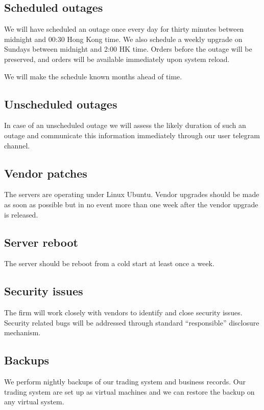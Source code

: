 \subsection{Scheduled outages}
We will have scheduled an outage once every day for thirty minutes
between midnight and 00:30 Hong Kong time.  We also schedule a weekly
upgrade on Sundays between midnight and 2:00 HK time.  Orders before
the outage will be preserved, and orders will be available immediately
upon system reload.

We will make the schedule known months ahead of time.

\subsection{Unscheduled outages}
In case of an unscheduled outage we will assess the likely duration of
such an outage and communicate this information immediately through
our user telegram channel.


\subsection{Vendor patches}
The servers are operating under Linux Ubuntu.  Vendor upgrades should
be made as soon as possible but in no event more than one week after
the vendor upgrade is released.

\subsection{Server reboot}
The server should be reboot from a cold start at least once a week.

\subsection{Security issues}
The firm will work closely with vendors to identify and close security
issues.  Security related bugs will be addressed through standard
``responsible'' disclosure mechanism.

\subsection{Backups}
We perform nightly backups of our trading system and business
records.  Our trading system are set up as virtual machines and we can
restore the backup on any virtual system.




